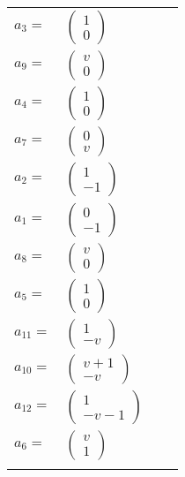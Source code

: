 \documentclass[1p]{elsarticle_modified}
\theoremstyle{definition}
\begin{document}
\begin{tabular}{m{7pt} m{180pt} m{7pt} m{180pt} }
\flushright $a_{3}=$&$\begin{pmatrix}1\\0\end{pmatrix}$ \\
\flushright $a_{9}=$&$\begin{pmatrix}v\\0\end{pmatrix}$ \\
\flushright $a_{4}=$&$\begin{pmatrix}1\\0\end{pmatrix}$ \\
\flushright $a_{7}=$&$\begin{pmatrix}0\\v\end{pmatrix}$ \\
\flushright $a_{2}=$&$\begin{pmatrix}1\\-1\end{pmatrix}$ \\
\flushright $a_{1}=$&$\begin{pmatrix}0\\-1\end{pmatrix}$ \\
\flushright $a_{8}=$&$\begin{pmatrix}v\\0\end{pmatrix}$ \\
\flushright $a_{5}=$&$\begin{pmatrix}1\\0\end{pmatrix}$ \\
\flushright $a_{11}=$&$\begin{pmatrix}1\\- v\end{pmatrix}$ \\
\flushright $a_{10}=$&$\begin{pmatrix}v+1\\- v\end{pmatrix}$ \\
\flushright $a_{12}=$&$\begin{pmatrix}1\\- v-1\end{pmatrix}$ \\
\flushright $a_{6}=$&$\begin{pmatrix}v\\1\end{pmatrix}$\\&\end{tabular}
\end{document}
